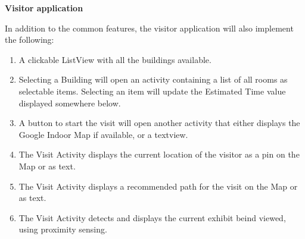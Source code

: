 \noindent \textbf{Visitor application}

In addition to the common features, the visitor application will also implement the following:
\begin{enumerate}
\item A clickable ListView with all the buildings available.
\item Selecting a Building will open an activity containing a list of all rooms as selectable items. Selecting an item will update the Estimated Time value displayed somewhere below.
\item A button to start the visit will open another activity that either displays the Google Indoor Map if available, or a textview.
\item The Visit Activity displays the current location of the visitor as a pin on the Map or as text.
\item The Visit Activity displays a recommended path for the visit on the Map or as text.
\item The Visit Activity detects and displays the current exhibit beind viewed, using proximity sensing.
\end{enumerate}

